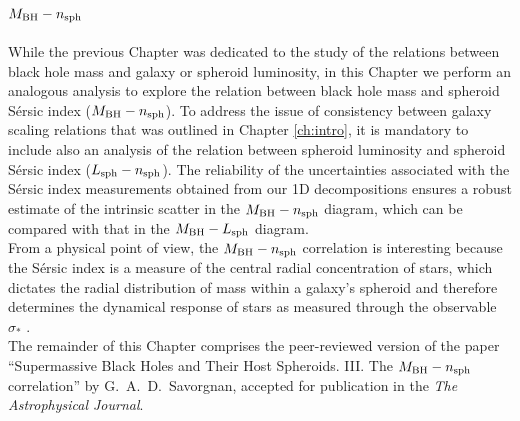 \chapter{$M_{\rm BH} - n_{\rm sph}$}
\label{ch:mn}

While the previous Chapter was dedicated to the study of the relations between 
black hole mass and galaxy or spheroid luminosity, 
in this Chapter we perform an analogous analysis 
to explore the relation between black hole mass and spheroid S\'ersic index ($M_{\rm BH} - n_{\rm sph}$). 
To address the issue of consistency between galaxy scaling relations 
that was outlined in Chapter \ref{ch:intro}, 
it is mandatory to include also an analysis of the relation between spheroid luminosity 
and spheroid S\'ersic index ($L_{\rm sph} - n_{\rm sph}$). 
The reliability of the uncertainties associated with the S\'ersic index measurements 
obtained from our 1D decompositions 
ensures a robust estimate of the intrinsic scatter in the $M_{\rm BH} - n_{\rm sph}$ diagram, 
which can be compared with that in the $M_{\rm BH} - L_{\rm sph}$ diagram. \\ 

From a physical point of view, the $M_{\rm BH} - n_{\rm sph}$ correlation is interesting because 
the S\'ersic index is a measure of the central radial concentration of stars, 
which dictates the radial distribution of mass within a galaxy's spheroid 
and therefore determines the dynamical response of stars 
as measured through the observable $\sigma_*$ \citep{grahamdriver2007}. \\

The remainder of this Chapter comprises the peer-reviewed version of the paper 
``Supermassive Black Holes and Their Host Spheroids. 
III. The $M_{\rm BH} - n_{\rm sph}$ correlation'' 
by G.~A.~D.~Savorgnan,  
accepted for publication in the \emph{The Astrophysical Journal}. 




